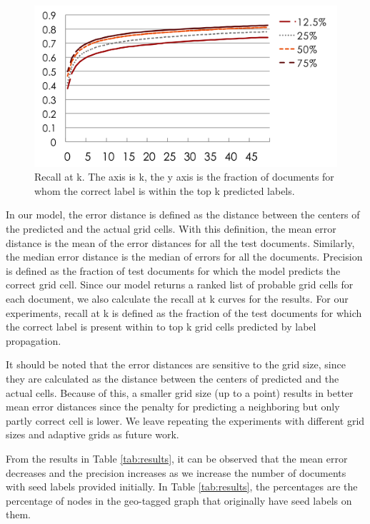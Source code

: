 \begin{figure}[tbp]
\begin{center}
\includegraphics[scale=0.45]{recall_at_k.png}
\caption{Recall at k. The axis is k, the y axis is the fraction of documents for whom the correct label is within the top k predicted labels.}
\label{fig:recall}
\end{center}
\end{figure}


In our model, the error distance is defined as the distance between the
centers of the predicted and the actual grid cells. With this
definition, the mean error distance is the mean of the error distances for all
the test documents. Similarly, the median error distance is the median of
errors for all the documents. Precision is defined as the
fraction of test documents for which the model predicts the correct grid cell.
Since our model returns a ranked list of probable grid cells for each
document,  we also
calculate the recall at k curves for the results. For our experiments, recall
at k is defined as the fraction of the test documents for which the correct
label is present within to top k grid cells predicted by label propagation.

It should be noted that the error distances are sensitive to the grid size,
since they are calculated as the distance between the centers of predicted and
the actual cells. Because of this, a smaller grid size (up to a point) results
in better mean error distances since the penalty for predicting a neighboring
but only partly correct cell is lower. We leave repeating the experiments with
different grid sizes and adaptive grids as future work.


From the results in Table \ref{tab:results}, it can be observed that the mean
error decreases and the precision increases as we increase the number of
documents with seed labels provided initially. In Table \ref{tab:results}, the
percentages are the percentage of nodes in the geo-tagged graph that
originally have seed labels on them.

